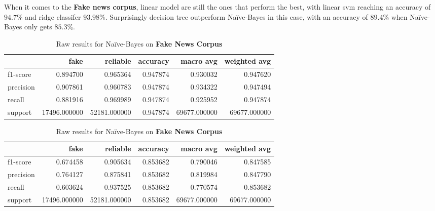 When it comes to the \textbf{Fake news corpus}, linear model are still the ones that perform the best, with linear svm reaching an accuracy of $94.7\%$ and ridge classifer $93.98\%$. Surprisingly decision tree outperform Na\"{i}ve-Bayes in this case, with an accuracy of $89.4\%$ when Na\"{i}ve-Bayes only gets $85.3\%$.\\
\begin{table}
\begin{subtable}{\textwidth}
	\begin{tabular}{lrrrrr}
	\toprule
	{} &          fake &      reliable &  accuracy &     macro avg &  weighted avg \\
	\midrule
	f1-score  &      0.894700 &      0.965364 &  0.947874 &      0.930032 &      0.947620 \\
	precision &      0.907861 &      0.960783 &  0.947874 &      0.934322 &      0.947494 \\
	recall    &      0.881916 &      0.969989 &  0.947874 &      0.925952 &      0.947874 \\
	support   &  17496.000000 &  52181.000000 &  0.947874 &  69677.000000 &  69677.000000 \\
	\bottomrule
	\end{tabular}
	\caption{Raw results for Linear SVM on \textbf{Fake News Corpus}}
\end{subtable}

\begin{subtable}{\textwidth}
	\begin{tabular}{lrrrrr}
	\toprule
	{} &          fake &      reliable &  accuracy &     macro avg &  weighted avg \\
	\midrule
	f1-score  &      0.674458 &      0.905634 &  0.853682 &      0.790046 &      0.847585 \\
	precision &      0.764127 &      0.875841 &  0.853682 &      0.819984 &      0.847790 \\
	recall    &      0.603624 &      0.937525 &  0.853682 &      0.770574 &      0.853682 \\
	support   &  17496.000000 &  52181.000000 &  0.853682 &  69677.000000 &  69677.000000 \\
	\bottomrule
	\end{tabular}
	\caption{Raw results for Na\"{i}ve-Bayes on \textbf{Fake News Corpus}}
\end{subtable}


\end{table}
